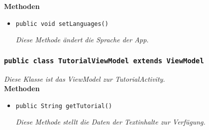 		\textbf{Methoden}
 			\begin{itemize}
        		\item\texttt{{public void setLanguages()}}
        	
        		\textit{Diese Methode ändert die Sprache der App.}
        	
       		 \end{itemize}
       		 
           		\subsubsection{\texttt{public class TutorialViewModel extends ViewModel}}
        \textit{Diese Klasse ist das ViewModel zur TutorialActivity.}\\
        
		\textbf{Methoden}
 			\begin{itemize}
        		\item\texttt{{public String getTutorial()}}
        		
        		\textit{Diese Methode stellt die Daten der Textinhalte zur Verfügung.}
        	
       		 \end{itemize}
